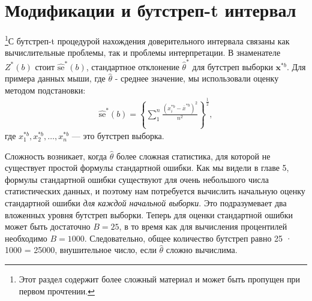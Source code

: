 \section{Модификации и бутстреп-t интервал}

\footnote{Этот раздел содержит более сложный материал и может быть пропущен при первом прочтении.}С бутстреп-t процедурой нахождения доверительного интервала связаны как вычислительные проблемы, так и проблемы интерпретации. В знаменателе $Z^{*}(b)$ стоит $\widehat{\text{se}}^{*}(b)$, стандартное отклонение $\widehat{\theta}^{*}$ для бутстреп выборки $\textbf{x}^{*b}$. Для примера данных мыши, где  $\widehat{\theta}$ - среднее значение, мы использовали оценку методом подстановки:
\begin{gather}\label{12.23}
\widehat{\text{se}}^{*}(b) = \left\{\sum_{1}^{n} \frac{(x_{i}^{*b} -  \overline{x}^{*b})^{2}}{n^{2}}\right\}^{\frac{1}{2}},
\end{gather}
где $x_{1}^{*b}, x_{2}^{*b},\ldots,x_{n}^{*b}$ --- это бутстреп выборка.

Сложность возникает, когда $\widehat{\theta}$ более сложная статистика, для которой не существует простой формулы стандартной ошибки. Как мы видели в главе 5, формулы стандартной ошибки существуют для очень небольшого числа статистических данных, и поэтому нам потребуется вычислить начальную оценку стандартной ошибки \textit{для каждой начальной выборки}. Это подразумевает два вложенных уровня бутстреп выборки. Теперь для оценки стандартной ошибки может быть достаточно $B = 25$, в то время как для вычисления процентилей необходимо $B = 1000$. Следовательно, общее количество бутстреп равно 25 · 1000 = 25000, внушительное число, если $\widehat{\theta}$ сложно вычислима.

